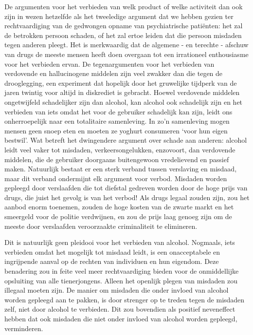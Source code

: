 \documentclass[
  a5paper,
  smalldemyvopaper,10pt,twoside,onecolumn,openright,extrafontsizes,hidelinks]{memoir}
\begin{document}
De argumenten voor het verbieden van welk product of welke activiteit
dan ook zijn in wezen hetzelfde als het tweeledige argument dat we
hebben gezien ter rechtvaardiging van de gedwongen opname van
psychiatrische patiënten: het zal de betrokken persoon schaden, of het
zal ertoe leiden dat die persoon misdaden tegen anderen pleegt. Het is
merkwaardig dat de algemene - en terechte - afschuw van drugs de meeste
mensen heeft doen overgaan tot een irrationeel enthousiasme voor het
verbieden ervan. De tegenargumenten voor het verbieden van verdovende en
hallucinogene middelen zijn veel zwakker dan die tegen de drooglegging,
een experiment dat hopelijk door het gruwelijke tijdperk van de jaren
twintig voor altijd in diskrediet is gebracht. Hoewel verdovende
middelen ongetwijfeld schadelijker zijn dan alcohol, kan alcohol ook
schadelijk zijn en het verbieden van iets omdat het voor de gebruiker
schadelijk kan zijn, leidt ons onherroepelijk naar een totalitaire
samenleving. In zo'n samenleving mogen mensen geen snoep eten en moeten
ze yoghurt consumeren `voor hun eigen bestwil'. Wat betreft het
dwingendere argument over schade aan anderen: alcohol leidt veel vaker
tot misdaden, verkeersongelukken, enzovoort, dan verdovende middelen,
die de gebruiker doorgaans buitengewoon vredelievend en passief maken.
Natuurlijk bestaat er een sterk verband tussen verslaving en misdaad,
maar dit verband ondermijnt elk argument voor verbod. Misdaden worden
gepleegd door verslaafden die tot diefstal gedreven worden door de hoge
prijs van drugs, die juist het gevolg is van het verbod! Als drugs
legaal zouden zijn, zou het aanbod enorm toenemen, zouden de hoge kosten
van de zwarte markt en het smeergeld voor de politie verdwijnen, en zou
de prijs laag genoeg zijn om de meeste door verslaafden veroorzaakte
criminaliteit te elimineren.

Dit is natuurlijk geen pleidooi voor het verbieden van alcohol.
Nogmaals, iets verbieden omdat het mogelijk tot misdaad leidt, is een
onacceptabele en ingrijpende aanval op de rechten van individuen en hun
eigendom. Deze benadering zou in feite veel meer rechtvaardiging bieden
voor de onmiddellijke opsluiting van alle tienerjongens. Alleen het
openlijk plegen van misdaden zou illegaal moeten zijn. De manier om
misdaden die onder invloed van alcohol worden gepleegd aan te pakken, is
door strenger op te treden tegen de misdaden zelf, niet door alcohol te
verbieden. Dit zou bovendien als positief neveneffect hebben dat ook
misdaden die niet onder invloed van alcohol worden gepleegd,
verminderen.
\end{document}
